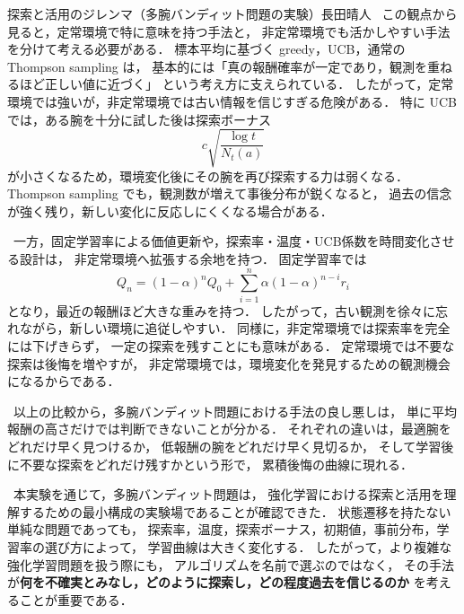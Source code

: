\begin{column}{探索と活用のジレンマ（多腕バンディット問題の実験）}{長田晴人}
\ この観点から見ると，定常環境で特に意味を持つ手法と，
非定常環境でも活かしやすい手法を分けて考える必要がある．
標本平均に基づく greedy，UCB，通常の Thompson sampling は，
基本的には「真の報酬確率が一定であり，観測を重ねるほど正しい値に近づく」
という考え方に支えられている．
したがって，定常環境では強いが，非定常環境では古い情報を信じすぎる危険がある．
特に UCB では，ある腕を十分に試した後は探索ボーナス
\[
    c\sqrt{\frac{\log t}{N_t(a)}}
\]
が小さくなるため，環境変化後にその腕を再び探索する力は弱くなる．
Thompson sampling でも，観測数が増えて事後分布が鋭くなると，
過去の信念が強く残り，新しい変化に反応しにくくなる場合がある．

\ 一方，固定学習率による価値更新や，探索率・温度・UCB係数を時間変化させる設計は，
非定常環境へ拡張する余地を持つ．
固定学習率では
\[
    Q_n
    =
    (1-\alpha)^nQ_0
    +
    \sum_{i=1}^{n}\alpha(1-\alpha)^{n-i}r_i
\]
となり，最近の報酬ほど大きな重みを持つ．
したがって，古い観測を徐々に忘れながら，新しい環境に追従しやすい．
同様に，非定常環境では探索率を完全には下げきらず，
一定の探索を残すことにも意味がある．
定常環境では不要な探索は後悔を増やすが，
非定常環境では，環境変化を発見するための観測機会になるからである．

\ 以上の比較から，多腕バンディット問題における手法の良し悪しは，
単に平均報酬の高さだけでは判断できないことが分かる．
それぞれの違いは，最適腕をどれだけ早く見つけるか，
低報酬の腕をどれだけ早く見切るか，
そして学習後に不要な探索をどれだけ残すかという形で，
累積後悔の曲線に現れる．

\ 本実験を通じて，多腕バンディット問題は，
強化学習における探索と活用を理解するための最小構成の実験場であることが確認できた．
状態遷移を持たない単純な問題であっても，
探索率，温度，探索ボーナス，初期値，事前分布，学習率の選び方によって，
学習曲線は大きく変化する．
したがって，より複雑な強化学習問題を扱う際にも，
アルゴリズムを名前で選ぶのではなく，
その手法が\textbf{何を不確実とみなし，どのように探索し，どの程度過去を信じるのか}
を考えることが重要である．

\end{column}
\clearpage
